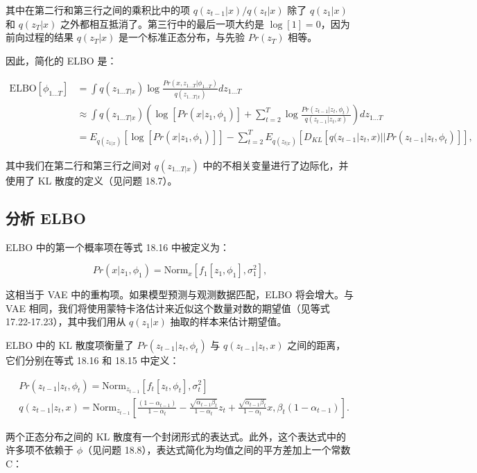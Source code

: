 其中在第二行和第三行之间的乘积比中的项 \(q(z_{t-1}|x)/q(z_t|x)\) 除了 \(q(z_1|x)\) 和 \(q(z_T|x)\) 之外都相互抵消了。第三行中的最后一项大约是 \(\log[1] = 0\)，因为前向过程的结果 \(q(z_T|x)\) 是一个标准正态分布，与先验 \(Pr(z_T)\) 相等。

因此，简化的 ELBO 是：


\begin{align}
\text{ELBO}[\phi_{1...T}] &= \int q(z_{1...T|x}) \log \frac{Pr(x, z_{1...T}|\phi_{1...T})}{q(z_{1...T|x})} dz_{1...T} \\
&\approx \int q(z_{1...T|x}) \left( \log [Pr(x|z_1, \phi_1)] + \sum_{t=2}^T \log \frac{Pr(z_{t-1}|z_t, \phi_t)}{q(z_{t-1}|z_t, x)} \right) dz_{1...T} \\
&= E_{q(z_{1|x})} \left[ \log [Pr(x|z_1, \phi_1)] \right] - \sum_{t=2}^T E_{q(z_{t|x})} \left[ D_{KL} \left[ q(z_{t-1}|z_t, x)||Pr(z_{t-1}|z_t, \phi_t) \right] \right],
\end{align}


其中我们在第二行和第三行之间对 \(q(z_{1...T|x})\) 中的不相关变量进行了边际化，并使用了 KL 散度的定义（见问题 18.7）。

\subsection{分析 ELBO}
ELBO 中的第一个概率项在等式 18.16 中被定义为：

\[
Pr(x|z_1, \phi_1) = \text{Norm}_x \left[ f_1[z_1, \phi_1], \sigma^2_{1} \right], \tag{18.26}
\]

这相当于 VAE 中的重构项。如果模型预测与观测数据匹配，ELBO 将会增大。与 VAE 相同，我们将使用蒙特卡洛估计来近似这个数量对数的期望值（见等式 17.22-17.23），其中我们用从 \(q(z_1|x)\) 抽取的样本来估计期望值。

ELBO 中的 KL 散度项衡量了 \(Pr(z_{t-1}|z_t, \phi_t)\) 与 \(q(z_{t-1}|z_t, x)\) 之间的距离，它们分别在等式 18.16 和 18.15 中定义：


\begin{align}
&Pr(z_{t-1}|z_t, \phi_t) = \text{Norm}_{z_{t-1}} \left[ f_t[z_t, \phi_t], \sigma^2_t \right] \\
&q(z_{t-1}|z_t, x) = \text{Norm}_{z_{t-1}} \left[ \frac{(1 - \alpha_{t-1})}{1 - \alpha_t} - \frac{\sqrt{\alpha_{t-1}\beta_t}}{1 - \alpha_t} z_t + \frac{\sqrt{\alpha_{t-1}\beta_t}}{1 - \alpha_t} x, \beta_t(1 - \alpha_{t-1}) \right].
\end{align} 


两个正态分布之间的 KL 散度有一个封闭形式的表达式。此外，这个表达式中的许多项不依赖于 \(\phi\)（见问题 18.8），表达式简化为均值之间的平方差加上一个常数 C：

